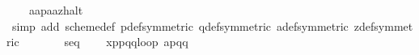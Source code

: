 \begin{isabellebody}
\ \ \ \ {}a{}{}{}{}a{}{}p{}{}{}a{}{}a{}{}z{}{}halt{}{}\isanewline
\ \ \ \ \isamarkupfalse%
\ {}simp\ add{}\ scheme{}{}def\ p{}def{}symmetric{}\ q{}def{}symmetric{}\ a{}def{}symmetric{}\ z{}def{}symmetric{}{}\isanewline
\isanewline
\ \ \isamarkupfalse%
\ \isamarkupfalse%
\ {}{}{}{}\ {}\ seq\isanewline
\ \ \ \ {}x{}{}p{}{}{}p{}{}{}q{}{}{}{}q{}{}{}{}loop\ {}{}a{}{}p{}{}{}q{}{}{}{}q{}{}{}{}\isanewline

\end{isabellebody}
